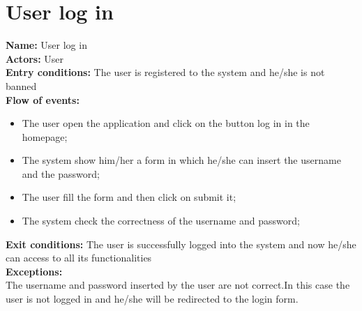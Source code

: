\section*{User log in} 
\textbf{Name:} User log in \\
\textbf{Actors:} User \\
\textbf{Entry conditions:} The user is registered to the system and he/she is not banned\\
\textbf{Flow of events:}
\begin{itemize}
\item The user open the application and click on the button log in in the homepage;
\item The system show him/her a form in which he/she can insert the username and the password;
\item The user fill the form and then click on submit it;
\item The system check the correctness of the username and password;
\end{itemize}
\textbf{Exit conditions:} The user is successfully logged into the system and now he/she can access to all its functionalities \\
\textbf{Exceptions:} \\
The username and password inserted by the user are not correct.In this case the user is not logged in and he/she will be redirected to the login form.\\

